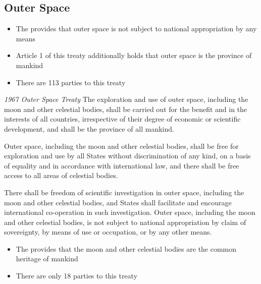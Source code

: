 \subsection{Outer Space}
\begin{itemize}
    \item The  provides that outer space is not subject to national appropriation by any means
    \item Article 1 of this treaty additionally holds that outer space is the province of mankind
    \item There are 113 parties to this treaty
\end{itemize}

\begin{conventiondetails}{\textit{1967 Outer Space Treaty}}
    \flushleft
    The exploration and use of outer space, including the moon and other celestial bodies, shall be carried out for the benefit and in the interests of all countries, irrespective of their degree of economic or scientific development, and shall be the province of all mankind.

    \vspace{\baselineskip}
    
    Outer space, including the moon and other celestial bodies, shall be free for exploration and use by all States without discrimination of any kind, on a basis of equality and in accordance with international law, and there shall be free access to all areas of celestial bodies.

    \vspace{\baselineskip}
    
    There shall be freedom of scientific investigation in outer space, including the moon and other celestial bodies, and States shall facilitate and encourage international co-operation in such investigation.
    Outer space, including the moon and other celestial bodies, is not subject to national appropriation by claim of sovereignty, by means of use or occupation, or by any other means.
\end{conventiondetails}

\begin{itemize}
    \item The  provides that the moon and other celestial bodies are the common heritage of mankind
    \item There are only 18 parties to this treaty
\end{itemize}

